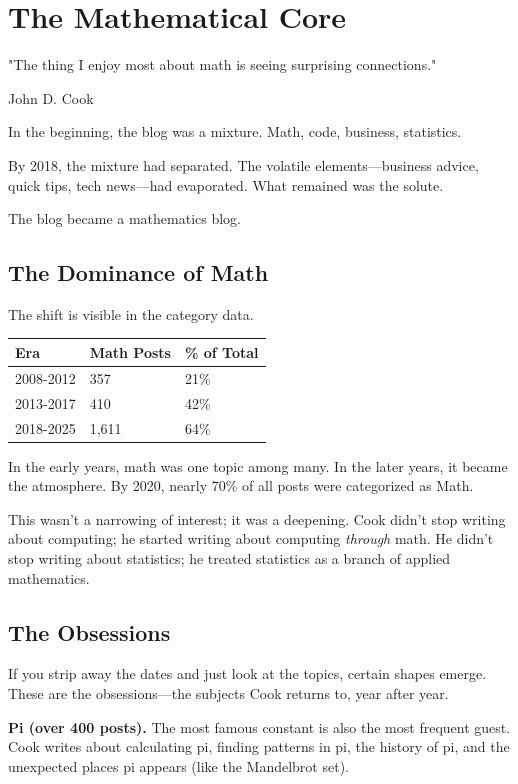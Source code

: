 \chapter{The Mathematical Core}

\nopagebreak
\epigraph{"The thing I enjoy most about math is seeing surprising connections."}{John D. Cook}
\nopagebreak

In the beginning, the blog was a mixture. Math, code, business, statistics.

By 2018, the mixture had separated. The volatile elements---business advice, quick tips, tech news---had evaporated. What remained was the solute.

The blog became a mathematics blog.

\bigskip

\section*{The Dominance of Math}

The shift is visible in the category data.

\begin{longtable}{p{3.00cm}p{3.00cm}p{3.00cm}}
\toprule
\textbf{Era} & \textbf{Math Posts} & \textbf{\% of Total} \tabularnewline
\midrule
2008-2012 & 357 & 21\% \tabularnewline
2013-2017 & 410 & 42\% \tabularnewline
2018-2025 & 1,611 & 64\% \tabularnewline
\bottomrule
\end{longtable}

In the early years, math was one topic among many. In the later years, it became the atmosphere. By 2020, nearly 70\% of all posts were categorized as Math.

This wasn't a narrowing of interest; it was a deepening. Cook didn't stop writing about computing; he started writing about computing \textit{through} math. He didn't stop writing about statistics; he treated statistics as a branch of applied mathematics.

\bigskip

\section*{The Obsessions}

If you strip away the dates and just look at the topics, certain shapes emerge. These are the obsessions---the subjects Cook returns to, year after year.

\textbf{Pi (over 400 posts).} The most famous constant is also the most frequent guest. Cook writes about calculating pi, finding patterns in pi, the history of pi, and the unexpected places pi appears (like the Mandelbrot set).

